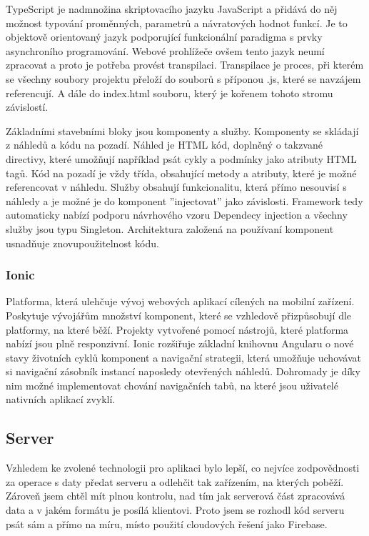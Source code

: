 \documentclass[
  biblatex,
  glossaries,
  index
]{kidiplom}
\begin{document}
TypeScript je nadmnožina skriptovacího jazyku JavaScript a přidává do něj možnost typování proměnných, parametrů a návratových hodnot funkcí. Je to objektově orientovaný jazyk podporující funkcionální paradigma s prvky asynchroního programování. Webové prohlížeče ovšem tento jazyk neumí zpracovat a proto je potřeba provést transpilaci. Transpilace je proces, při kterém se všechny soubory projektu přeloží do souborů s příponou .js, které se navzájem referencují. A dále do index.html souboru, který je kořenem tohoto stromu závislostí.

Základními stavebními bloky jsou komponenty a služby. Komponenty se skládají z náhledů a kódu na pozadí. Náhled je HTML kód, doplněný o takzvané directivy, které umožňují například psát cykly a podmínky jako atributy HTML tagů. Kód na pozadí je vždy třída, obsahující metody a atributy, které je možné referencovat v náhledu. Služby obsahují funkcionalitu, která přímo nesouvisí s náhledy a je možné je do komponent ''injectovat'' jako závislosti. \cite{8} Framework tedy automaticky nabízí podporu návrhového vzoru Dependecy injection a všechny služby jsou typu Singleton. Architektura založená na používaní komponent usnadňuje znovupoužitelnost kódu.

\subsubsection{Ionic}
Platforma, která ulehčuje vývoj webových aplikací cílených na mobilní zařízení. Poskytuje vývojářům množství komponent, které se vzhledově přizpůsobují dle platformy, na které běží. Projekty vytvořené pomocí nástrojů, které platforma nabízí jsou plně responzivní. Ionic rozšiřuje základní knihovnu Angularu o nové stavy životních cyklů komponent a navigační strategii, která umožňuje uchovávat si navigační zásobník instancí naposledy otevřených náhledů. Dohromady je díky nim možné implementovat chování navigačních tabů, na které jsou uživatelé nativních aplikací zvyklí. 

\subsection{Server}
Vzhledem ke zvolené technologii pro aplikaci bylo lepší, co nejvíce zodpovědnosti za operace s daty předat serveru a odlehčit tak zařízením, na kterých poběží. Zároveň jsem chtěl mít plnou kontrolu, nad tím jak serverová část zpracovává data a v jakém formátu je posílá klientovi. Proto jsem se rozhodl kód serveru psát sám a přímo na míru, místo použití cloudových řešení jako Firebase. 
\end{document}
